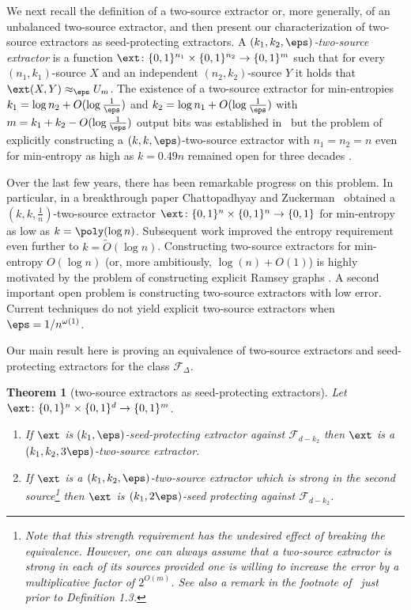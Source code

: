 \documentclass[11pt]{article}
\numberwithin{equation}{section}
\newtheorem{theorem}{Theorem}[section]
\theoremstyle{definition}
\theoremstyle{plain}
\begin{document}
We next recall the definition of a two-source extractor or, more generally, of
an %
unbalanced two-source %
%
extractor,  %
and then present our characterization of two-source extractors as seed-protecting extractors. A \emph{$(k_1,k_2,\eps)$-two-source extractor} is a function $\ext \colon \{0,1\}^{n_1} \times \{0,1\}^{n_2} \to \{0,1\}^m$ such that for every $(n_1,k_1)$-source $X$ and an independent $(n_2,k_2)$-source $Y$ it holds that $\ext(X,Y) \approx_\eps U_m$. The existence of a two-source extractor for min-entropies $k_1 = \log{n_2}+ O(\log\frac1{\eps})$ and $k_2 = \log{n_1} + O(\log\frac1{\eps})$ with $m=k_1+k_2-O(\log\frac1{\eps})$ output bits was established %
%
in~\cite{CG88}  %
but the problem of explicitly constructing a $(k,k,\eps)$-two-source extractor with $n_1 = n_2 = n$ even for min-entropy as high as $k = 0.49n$ remained open for three decades \cite{CG88,Bourgain05,Raz05}.

Over the last few years, there has been remarkable progress on this problem. In particular, in a breakthrough %
paper %
Chattopadhyay and Zuckerman~\cite{CZ19}  obtained a $(k,k,\frac1{n})$-two-source extractor $\ext \colon \{0,1\}^n \times \{0,1\}^n \to \{0,1\}$ for min-entropy as low as $k = \poly(\log{n})$. %
Subsequent  %
work
\cite{BADTS17,Cohen17,Li19} improved the entropy requirement even further to $k = \widetilde{O}(\log{n})$. Constructing two-source extractors for min-entropy $O(\log{n})$ (or, more ambitiously, $\log(n)+O(1)$) is highly motivated by the problem of constructing explicit Ramsey graphs \cite{BKSSW10,BRSW12,Cohen16,Cohen17}. A second important open problem is constructing two-source extractors with low error. Current techniques do not yield explicit two-source extractors when 
%
%
$\eps = 1/n^{\omega(1)}$. 
%



Our main result here is proving an equivalence of two-source extractors and seed-protecting extractors for the class $\mathcal{F}_{\Delta}$.  %
%
%


%

\begin{theorem}[two-source extractors as seed-protecting extractors]  %
\label{thm:two source sp intro}
	Let $\ext \colon \{0,1\}^n \times \{0,1\}^d \to \{0,1\}^m$. 
	\begin{enumerate}
		\item If $\ext$ is $(k_1,\eps)$-seed-protecting extractor against $\mathcal{F}_{d-k_2}$ then $\ext$ is a $(k_1,k_2,3\eps)$-two-source extractor.
		\item If $\ext$ is a $(k_1,k_2,\eps)$-two-source extractor which is strong in the second source\footnote{Note that this %
strength %
requirement has the undesired effect of breaking the equivalence. However, one can always assume that a two-source extractor is strong in each of its sources provided one is willing to increase the error by a multiplicative factor of $2^{O(m)}$. See also a remark in the footnote of~\cite{Raz05} just prior to Definition 1.3.} then $\ext $ is $(k_1,2\eps)$-seed protecting against $\mathcal{F}_{d-k_2}$.
	\end{enumerate}
\end{theorem}
\end{document}

